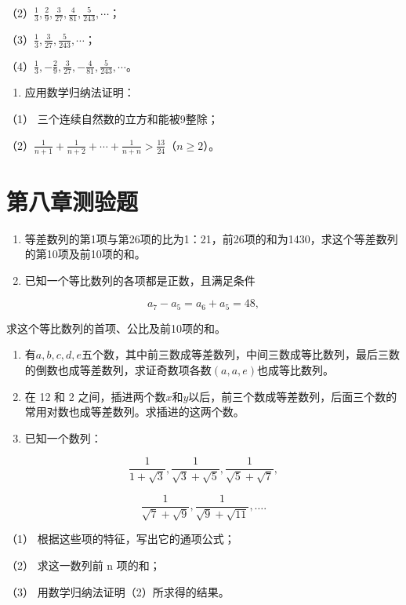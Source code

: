 （2）\(\frac{1}{3}, \frac{2}{9}, \frac{3}{27}, \frac{4}{81}, \frac{5}{243}, \cdots\)；

（3）\(\frac{1}{3}, \frac{3}{27}, \frac{5}{243}, \cdots\)；

（4）\(\frac{1}{3}, -\frac{2}{9}, \frac{3}{27}, -\frac{4}{81}, \frac{5}{243}, \cdots\)。

\begin{enumerate}[start=8]
\item
  应用数学归纳法证明：
\end{enumerate}

（1） 三个连续自然数的立方和能被9整除；

（2）\(\frac{1}{n + 1} + \frac{1}{n + 2} + \cdots + \frac{1}{n + n} > \frac{13}{24}\)（\(n \geqslant 2\)）。

\section{第八章测验题}

\begin{enumerate}
\item
  等差数列的第1项与第26项的比为1：21，前26项的和为1430，求这个等差数列的第10项及前10项的和。
\item
  已知一个等比数列的各项都是正数，且满足条件
\end{enumerate}

\[
a_{7} - a_{5} = a_{6} + a_{5} = 48,
\]

求这个等比数列的首项、公比及前10项的和。

\begin{enumerate}[start=3]
\item
  有\(a, b, c, d, e\)五个数，其中前三数成等差数列，中间三数成等比数列，最后三数的倒数也成等差数列，求证奇数项各数\((a, a, e)\)也成等比数列。
\item
  在 12 和 2
  之间，插进两个数\(x\)和\(y\)以后，前三个数成等差数列，后面三个数的常用对数也成等差数列。求插进的这两个数。
\item
  已知一个数列：
\end{enumerate}

\[
\frac{1}{1 + \sqrt{3}}, \frac{1}{\sqrt{3} + \sqrt{5}}, \frac{1}{\sqrt{5} + \sqrt{7}},
\]

\[
\frac{1}{\sqrt{7} + \sqrt{9}}, \frac{1}{\sqrt{9} + \sqrt{11}}, \dots.
\]

（1） 根据这些项的特征，写出它的通项公式；

（2） 求这一数列前 n 项的和；

（3） 用数学归纳法证明（2）所求得的结果。

